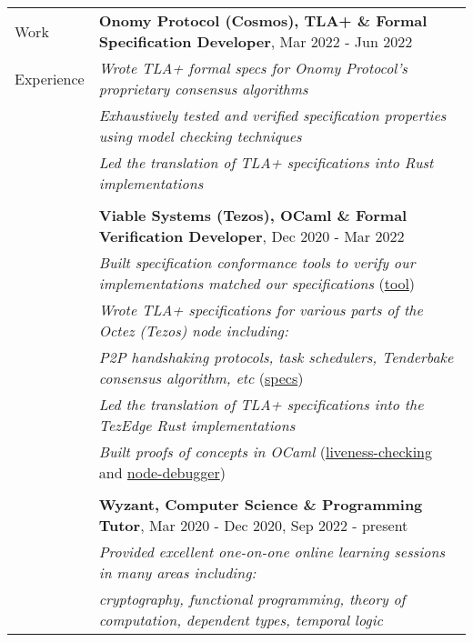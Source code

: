 \documentclass[letterpaper,10pt,oneside]{article}
\begin{document}
\noindent \begin{tabular}{@{} l l}
 \Large{Work} & \textbf{Onomy Protocol (Cosmos), TLA+ \& Formal Specification Developer}, Mar 2022 - Jun 2022 \\
 \Large{Experience} & \emph{Wrote TLA+ formal specs for Onomy Protocol's proprietary consensus algorithms} \\
 \hspace{1.1in} & \emph{Exhaustively tested and verified specification properties using model checking techniques} \\
 & \emph{Led the translation of TLA+ specifications into Rust implementations} \\
 & \\
 & \textbf{Viable Systems (Tezos), OCaml \& Formal Verification Developer}, Dec 2020 - Mar 2022 \\
 & \emph{Built specification conformance tools to verify our implementations matched our specifications} (\href{https://github.com/Isaac-DeFrain?tab=repositories&q=&type=&language=tla&sort=}{tool}) \\
 & \emph{Wrote TLA+ specifications for various parts of the Octez (Tezos) node including:} \\
 & \emph{  P2P handshaking protocols, task schedulers, Tenderbake consensus algorithm, etc} (\href{https://github.com/tezedge/tezedge-specification}{specs}) \\
 & \emph{Led the translation of TLA+ specifications into the TezEdge Rust implementations} \\
 & \emph{Built proofs of concepts in OCaml} (\href{https://github.com/Isaac-DeFrain/liveness-checking}{liveness-checking} and \href{https://github.com/Isaac-DeFrain/node-debugger}{node-debugger}) \\
 & \\
 & \textbf{Wyzant, Computer Science \& Programming Tutor}, Mar 2020 - Dec 2020, Sep 2022 - present \\
 & \emph{Provided excellent one-on-one online learning sessions in many areas including:} \\
 & \emph{cryptography, functional programming, theory of computation, dependent types, temporal logic} \\

\end{tabular}
\end{document}
